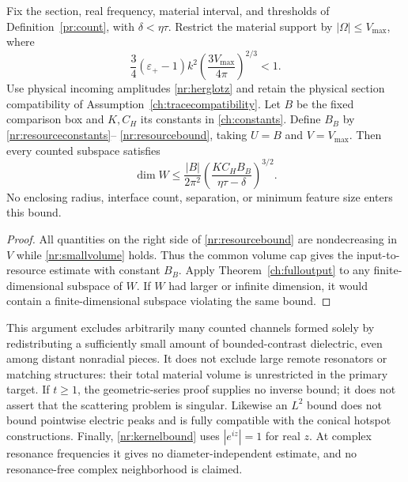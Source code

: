 \begin{corollary}
\label{nr:channelcount}
Fix the section, real frequency, material interval, and thresholds of
Definition~\ref{pr:count}, with $\delta<\eta\tau$. Restrict the material
support by $|\Omega|\leq V_{\max}$, where
\begin{equation}
 \frac34(\varepsilon_+-1)k^2
       \left(\frac{3V_{\max}}{4\pi}\right)^{2/3}<1.
 \label{nr:volumecap}
\end{equation}
Use physical incoming amplitudes \eqref{nr:herglotz} and retain the physical
section compatibility of Assumption~\ref{ch:tracecompatibility}. Let $B$
be the fixed comparison box and $K,C_H$ its constants in
\eqref{ch:constants}. Define $B_B$ by \eqref{nr:resourceconstants}--
\eqref{nr:resourcebound}, taking $U=B$ and $V=V_{\max}$. Then every counted
subspace satisfies
\begin{equation}
 \dim W\leq\frac{|B|}{2\pi^2}
      \left(\frac{K C_H B_B}{\eta\tau-\delta}\right)^{3/2}.
 \label{nr:channelbound}
\end{equation}
No enclosing radius, interface count, separation, or minimum feature size
enters this bound.
\end{corollary}
\begin{proof}
All quantities on the right side of \eqref{nr:resourcebound} are
nondecreasing in $V$ while \eqref{nr:smallvolume} holds. Thus the common
volume cap gives the input-to-resource estimate with constant $B_B$.
Apply Theorem~\ref{ch:fulloutput} to any finite-dimensional subspace of $W$.
If $W$ had larger or infinite dimension, it would contain a finite-dimensional
subspace violating the same bound.
\end{proof}

\begin{remark}
\label{nr:scope}
This argument excludes arbitrarily many counted channels formed solely by
redistributing a sufficiently small amount of bounded-contrast dielectric,
even among distant nonradial pieces. It does not exclude large remote
resonators or matching structures: their total material volume is unrestricted
in the primary target. If $t\geq1$, the geometric-series proof supplies no
inverse bound; it does not assert that the scattering problem is singular.
Likewise an $L^2$ bound does not bound pointwise electric peaks and is fully
compatible with the conical hotspot constructions. Finally,
\eqref{nr:kernelbound} uses $|e^{iz}|=1$ for real $z$. At complex resonance
frequencies it gives no diameter-independent estimate, and no resonance-free
complex neighborhood is claimed.
\end{remark}
